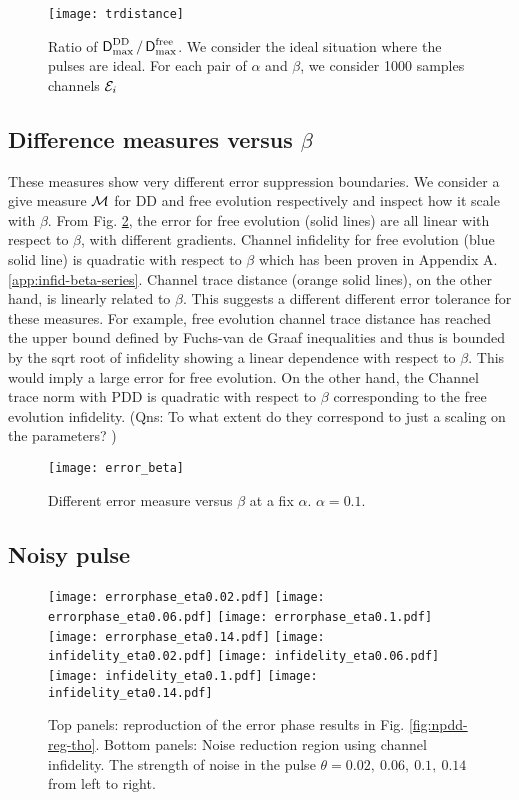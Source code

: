 \documentclass[aps,pra,reprint,superscriptaddress]{revtex4-2}
\begin{document}
\begin{figure}
    \centering
    \texttt{[image: trdistance]}
    \caption{Ratio of $\operatorname{\mathsf{D}}^{\rm DD}_{\rm max} / \operatorname{\mathsf{D}}^{\rm free}_{\rm max}$. We consider the ideal situation where the pulses are ideal. For each pair of $\alpha$ and $\beta$, we consider 1000 samples channels ${\mathcal{E}}_i$} 
    \label{fig:pdd-region-trdistance}
\end{figure}


\subsection{Difference measures versus $\beta$}
These measures show very different error suppression boundaries. We consider a give measure $\mathcal{M}$ for DD and free evolution respectively and inspect how it scale with $\beta$. From Fig. \ref{fig:pdd-region-beta}, the error for free evolution (solid lines) are all linear with respect to $\beta$, with different gradients. Channel infidelity for free evolution (blue solid line) is quadratic with respect to $\beta$ which has been proven in Appendix A. \ref{app:infid-beta-series}. Channel trace distance (orange solid lines), on the other hand, is linearly related to $\beta$. This suggests a different different error tolerance for these measures. For example, free evolution channel trace distance has reached the upper bound defined by Fuchs-van de Graaf inequalities and thus is bounded by the sqrt root of infidelity showing a linear dependence with respect to $\beta$. This would imply a large error for free evolution. On the other hand, the Channel trace norm with PDD is quadratic with respect to $\beta$ corresponding to the free evolution infidelity. ({Qns: \color{red} To what extent do they correspond to just a scaling on the parameters?} )

\begin{figure}
    \centering
    \texttt{[image: error\_beta]}
    \caption{Different error measure versus $\beta$ at a fix $\alpha$. $\alpha=0.1$.} 
    \label{fig:pdd-region-beta}
\end{figure}




\subsection{Noisy pulse}
\begin{figure*}[ht!]
    \centering
    \texttt{[image: errorphase\_eta0.02.pdf]}
    \texttt{[image: errorphase\_eta0.06.pdf]}
    \texttt{[image: errorphase\_eta0.1.pdf]}
    \texttt{[image: errorphase\_eta0.14.pdf]}
    \texttt{[image: infidelity\_eta0.02.pdf]}
    \texttt{[image: infidelity\_eta0.06.pdf]}
    \texttt{[image: infidelity\_eta0.1.pdf]}
    \texttt{[image: infidelity\_eta0.14.pdf]}
    \caption{Top panels: reproduction of the error phase results in Fig. \ref{fig:npdd-reg-tho}. Bottom panels: Noise reduction region using channel infidelity. The strength of noise in the pulse $\theta = 0.02,~0.06,~0.1,~0.14$ from left to right. } 
    \label{fig:noisy-pulse-comparison}
\end{figure*}
\end{document}
